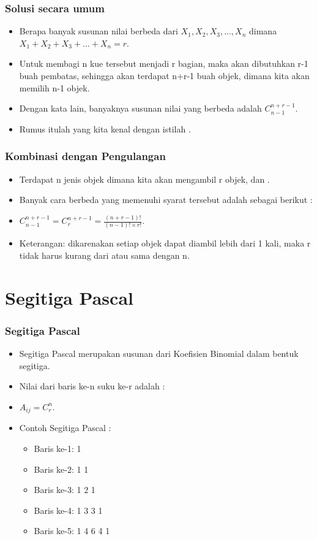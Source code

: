 \begin{frame}
\frametitle{Solusi secara umum}
\begin{itemize}
  \item Berapa banyak susunan nilai berbeda dari $X_{1}, X_{2}, X_{3}, ..., X_{n}$ dimana $X_{1} + X_{2} + X_{3} + ... + X_{n} = r$.
  \item Untuk membagi n kue tersebut menjadi r bagian, maka akan dibutuhkan r-1 buah pembatas, sehingga akan terdapat n+r-1 buah objek, dimana kita akan memilih n-1 objek.
  \item Dengan kata lain, banyaknya susunan nilai yang berbeda adalah $C^{n+r-1}_{n-1}$.
  \item Rumus itulah yang kita kenal dengan istilah .
\end{itemize}
\end{frame}

\begin{frame}
\frametitle{Kombinasi dengan Pengulangan}
\begin{itemize}
  \item Terdapat n jenis objek dimana kita akan mengambil r objek, dan .
  \item Banyak cara berbeda yang memenuhi syarat tersebut adalah sebagai berikut :
  \item $C^{n+r-1}_{n-1} = C^{n+r-1}_{r} = \frac{(n+r-1)!}{(n-1)! \times r!}$.
  \item Keterangan: dikarenakan setiap objek dapat diambil lebih dari 1 kali, maka r tidak harus kurang dari atau sama dengan n.
\end{itemize}
\end{frame}

\section{Segitiga Pascal}
\frame{\sectionpage}

\begin{frame}
\frametitle{Segitiga Pascal}
\begin{itemize}
  \item Segitiga Pascal merupakan susunan dari Koefisien Binomial dalam bentuk segitiga.
  \item Nilai dari baris ke-n suku ke-r adalah :
  \item $A_{ij} = C^{n}_{r}$.
  \item Contoh Segitiga Pascal :
  \begin{itemize} 
    \item Baris ke-1: 1
    \item Baris ke-2: 1 1
    \item Baris ke-3: 1 2 1
    \item Baris ke-4: 1 3 3 1
    \item Baris ke-5: 1 4 6 4 1
  \end{itemize}
\end{itemize}
\end{frame}

